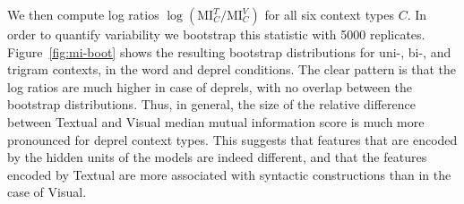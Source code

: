 
We then compute log ratios $\log(\mathrm{MI}^{T}_{C}/\mathrm{MI}^{V}_{C})$ 
for all six context types $C$. In order to quantify variability we bootstrap this statistic with
5000 replicates. Figure~\ref{fig:mi-boot} shows the resulting bootstrap distributions 
for uni-, bi-, and trigram contexts, in the word and deprel conditions. The clear pattern is 
that the log ratios are much higher in case of deprels, with no overlap between
the bootstrap distributions. Thus, in general, the size of the
relative difference between {\sc Textual} and {\sc Visual} median
mutual information score is much more pronounced for deprel context types.
This suggests that features that are encoded by the hidden units of
the models are indeed different, and that the features encoded by {\sc Textual} are more 
associated with syntactic constructions than in the case of  {\sc Visual}.

